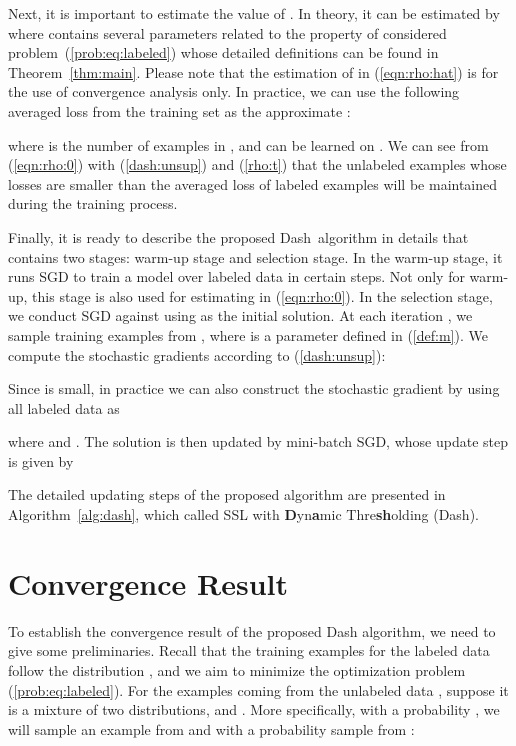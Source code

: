 \documentclass{article}
\def \Alg {Dash}
\begin{document}
Next, it is important to estimate the value of . In theory, it can be estimated by 
where contains several parameters related to the property of considered problem~(\ref{prob:eq:labeled}) whose detailed definitions can be found in Theorem~\ref{thm:main}. Please note that the estimation of  in (\ref{eqn:rho:hat}) is for the use of convergence analysis only. In practice, we can use the following averaged loss from the training set  as the approximate :
 
where  is the number of examples in , and  can be learned on . We can see from (\ref{eqn:rho:0}) with (\ref{dash:unsup}) and (\ref{rho:t}) that the unlabeled examples whose losses are smaller than the averaged loss of labeled examples will be maintained during the training process. 


Finally, it is ready to describe the proposed \Alg~algorithm in details that contains two stages: warm-up stage and selection stage. In the warm-up stage, it runs SGD to train a model over labeled data  in certain steps.  Not only for warm-up, this stage is also used for estimating  in (\ref{eqn:rho:0}). 
In the selection stage, we conduct SGD against  using  as the initial solution. At each iteration , we sample  training examples from , where  is a parameter defined in (\ref{def:m}). We compute the stochastic gradients according to (\ref{dash:unsup}):

Since  is small, in practice we can also construct the stochastic gradient by using all labeled data as 

where  and . 
The solution is then updated by mini-batch SGD, whose update step is given by

The detailed updating steps of the proposed algorithm are presented in Algorithm~\ref{alg:dash}, which called SSL with {\bf D}yn{\bf a}mic Thre{\bf sh}olding (\Alg).



\section{Convergence Result}
To establish the convergence result of the proposed Dash algorithm, we need to give some preliminaries. 
Recall that the training examples for the labeled data  follow the distribution , and we aim to minimize the optimization problem (\ref{prob:eq:labeled}).
For the examples coming from the unlabeled data , suppose it is a mixture of two distributions,  and . More specifically, with a probability , we will sample an example from  and with a probability  sample from :
\end{document}
